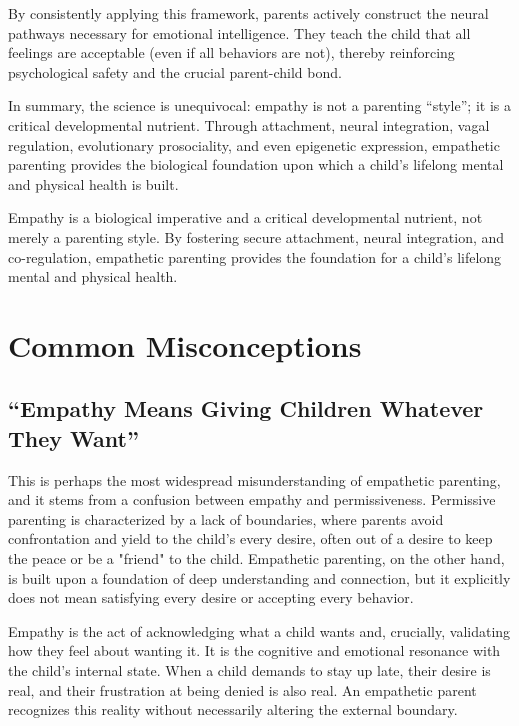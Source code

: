 By consistently applying this framework, parents actively construct the neural pathways necessary for emotional intelligence. 
They teach the child that all feelings are acceptable (even if all behaviors are not), thereby reinforcing psychological safety and the crucial parent-child bond.

In summary, the science is unequivocal: empathy is not a parenting ``style''; it is a critical developmental nutrient. 
Through attachment, neural integration, vagal regulation, evolutionary prosociality, and even epigenetic expression, empathetic parenting provides the biological foundation upon which a child's lifelong mental and physical health is built.

\begin{keyinsight}
Empathy is a biological imperative and a critical developmental nutrient, not merely a parenting style. 
By fostering secure attachment, neural integration, and co-regulation, empathetic parenting provides the foundation for a child's lifelong mental and physical health.
\end{keyinsight}

\section{Common Misconceptions}

\subsection{``Empathy Means Giving Children Whatever They Want''}

This is perhaps the most widespread misunderstanding of empathetic parenting, and it stems from a confusion between empathy and permissiveness.
Permissive parenting is characterized by a lack of boundaries, where parents avoid confrontation and yield to the child's every desire, often out of a desire to keep the peace or be a "friend" to the child.
Empathetic parenting, on the other hand, is built upon a foundation of deep understanding and connection, but it explicitly does not mean satisfying every desire or accepting every behavior.

Empathy is the act of acknowledging what a child wants and, crucially, validating how they feel about wanting it.
It is the cognitive and emotional resonance with the child's internal state.
When a child demands to stay up late, their desire is real, and their frustration at being denied is also real.
An empathetic parent recognizes this reality without necessarily altering the external boundary.

